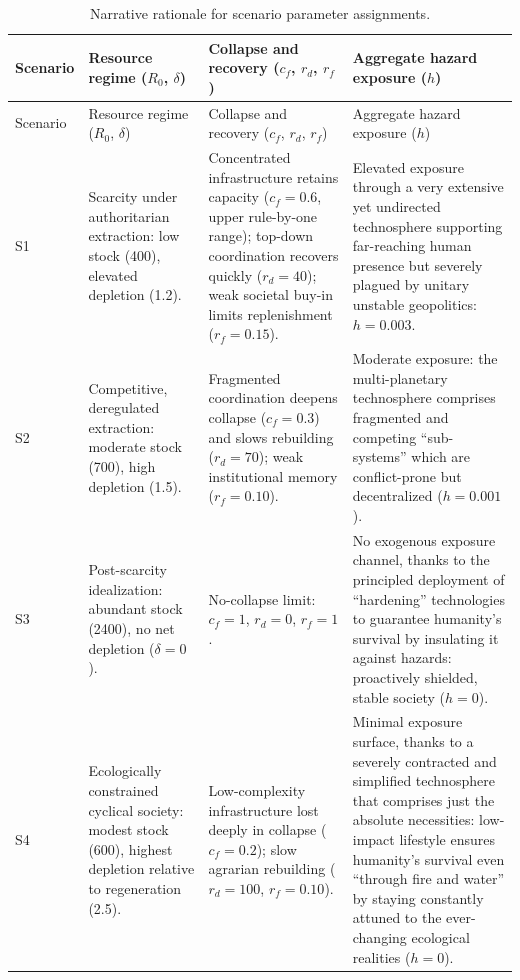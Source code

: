 \documentclass[11pt]{article}
\begin{document}
{\footnotesize
\setlength{\tabcolsep}{4pt}
\renewcommand{\arraystretch}{1.25}
\begin{longtable}{l >{\raggedright\arraybackslash}p{3.6cm} >{\raggedright\arraybackslash}p{4.2cm} >{\raggedright\arraybackslash}p{6.2cm}}
\caption{Narrative rationale for scenario parameter assignments.}\label{tab:rationale} \\
\toprule
Scenario & Resource regime ($R_0$, $\delta$) & Collapse and recovery ($c_f$, $r_d$, $r_f$) & Aggregate hazard exposure ($h$) \\
\midrule
\endfirsthead
\toprule
Scenario & Resource regime ($R_0$, $\delta$) & Collapse and recovery ($c_f$, $r_d$, $r_f$) & Aggregate hazard exposure ($h$) \\
\midrule
\endhead
\bottomrule
\endlastfoot
S1 & Scarcity under authoritarian extraction: low stock (400), elevated depletion (1.2). & Concentrated infrastructure retains capacity ($c_f{=}0.6$, upper rule-by-one range); top-down coordination recovers quickly ($r_d{=}40$); weak societal buy-in limits replenishment ($r_f{=}0.15$). & Elevated exposure through a very extensive yet undirected technosphere supporting far-reaching human presence but severely plagued by unitary unstable geopolitics: $h{=}0.003$. \\
S2 & Competitive, deregulated extraction: moderate stock (700), high depletion (1.5). & Fragmented coordination deepens collapse ($c_f{=}0.3$) and slows rebuilding ($r_d{=}70$); weak institutional memory ($r_f{=}0.10$). & Moderate exposure: the multi-planetary technosphere comprises fragmented and competing ``sub-systems'' which are conflict-prone but decentralized ($h{=}0.001$). \\
S3 & Post-scarcity idealization: abundant stock (2400), no net depletion ($\delta{=}0$). & No-collapse limit: $c_f{=}1$, $r_d{=}0$, $r_f{=}1$. & No exogenous exposure channel, thanks to the principled deployment of ``hardening'' technologies to guarantee humanity's survival by insulating it against hazards: proactively shielded, stable society ($h{=}0$). \\
S4 & Ecologically constrained cyclical society: modest stock (600), highest depletion relative to regeneration (2.5). & Low-complexity infrastructure lost deeply in collapse ($c_f{=}0.2$); slow agrarian rebuilding ($r_d{=}100$, $r_f{=}0.10$). & Minimal exposure surface, thanks to a severely contracted and simplified technosphere that comprises just the absolute necessities: low-impact lifestyle ensures humanity's survival even ``through fire and water'' by staying constantly attuned to the ever-changing ecological realities ($h{=}0$). \\

\end{longtable}}
\end{document}
